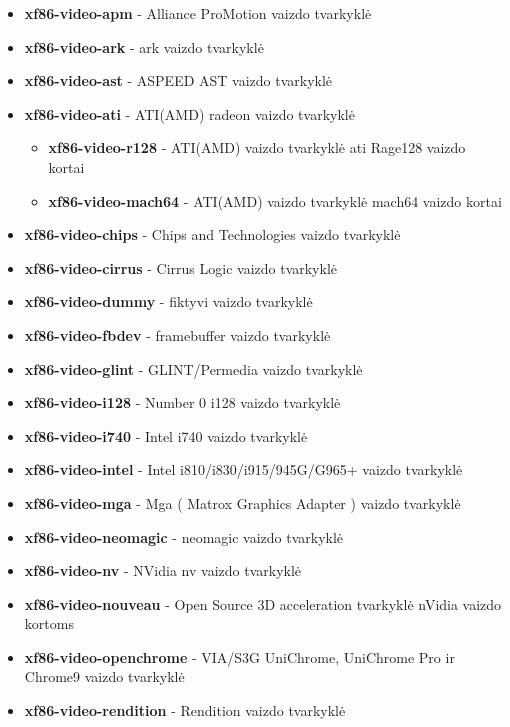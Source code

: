       \begin{itemize}
        \item \textbf{xf86-video-apm} - Alliance ProMotion vaizdo
          tvarkyklė
        \item \textbf{xf86-video-ark} - ark vaizdo tvarkyklė
        \item \textbf{xf86-video-ast} - ASPEED AST vaizdo tvarkyklė
        \item \textbf{xf86-video-ati} - ATI(AMD) radeon vaizdo
          tvarkyklė
          \begin{itemize}
            \item \textbf{xf86-video-r128} - ATI(AMD) vaizdo tvarkyklė
              ati Rage128 vaizdo kortai
            \item \textbf{xf86-video-mach64} - ATI(AMD) vaizdo
              tvarkyklė mach64 vaizdo kortai
          \end{itemize}
        \item \textbf{xf86-video-chips} - Chips and Technologies vaizdo tvarkyklė
        \item \textbf{xf86-video-cirrus} - Cirrus Logic vaizdo tvarkyklė
        \item \textbf{xf86-video-dummy} - fiktyvi vaizdo tvarkyklė
        \item \textbf{xf86-video-fbdev} - framebuffer vaizdo tvarkyklė
        \item \textbf{xf86-video-glint} - GLINT/Permedia vaizdo tvarkyklė
        \item \textbf{xf86-video-i128} - Number 0 i128 vaizdo tvarkyklė
        \item \textbf{xf86-video-i740} - Intel i740 vaizdo tvarkyklė
        \item \textbf{xf86-video-intel} - Intel i810/i830/i915/945G/G965+ vaizdo tvarkyklė
        \item \textbf{xf86-video-mga} - Mga ( Matrox Graphics Adapter ) vaizdo tvarkyklė
        \item \textbf{xf86-video-neomagic} - neomagic vaizdo tvarkyklė
        \item \textbf{xf86-video-nv} - NVidia nv vaizdo tvarkyklė
        \item \textbf{xf86-video-nouveau} - Open Source 3D
          acceleration tvarkyklė nVidia vaizdo kortoms
        \item \textbf{xf86-video-openchrome} - VIA/S3G UniChrome,
          UniChrome Pro ir Chrome9 vaizdo tvarkyklė
        \item \textbf{xf86-video-rendition} - Rendition vaizdo tvarkyklė

\end{itemize}
